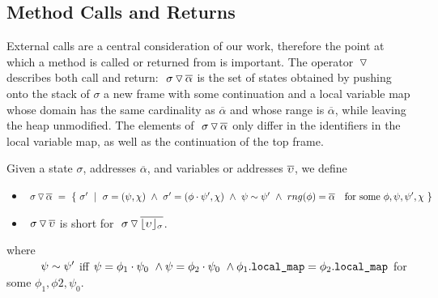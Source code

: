 \subsection{ Method Calls and Returns}


{External calls are a central consideration of our work, therefore  the point at which a method is called or returned from is important.
The operator $\, {\triangledown}\,$ describes both call and return:
 $  \ {\sigma} \, {\triangledown}\, \overline{\alpha}  $ is  the set of states obtained by pushing onto the stack of $\sigma$ a new frame with some continuation  and a local variable map {whose domain has the same cardinality as $\overline \alpha$ and whose range is} $\overline \alpha$, while leaving the heap unmodified.
The elements of $  \ {\sigma} \, {\triangledown}\, \overline{\alpha}  $ only differ in the identifiers in the local variable map, as well as the continuation  of the top frame. 
}

\begin{definition}
\label{def:push:frame}
Given a state $\sigma$, addresses $\overline \alpha$, and variables or addresses $\overline {\upsilon}$, we define
\begin{itemize}
\item
$ \PushS  {\alpha} {\sigma} \ =\ \{ \ \sigma' \ \mid\ \sigma=(\psi, \chi)\  \wedge\  \sigma'=(\phi\cdot \psi', \chi) \ \wedge\ {\psi\sim\psi'} \ \wedge\ rng(\phi)=\overline \alpha \ \ \mbox{ for some } \phi, \psi, \psi', \chi \ \}$
\item
{$  \ {\sigma} \, {\triangledown}\, \overline{\upsilon} $ is short for  $  \ {\sigma} \, {\triangledown}\, \overline{\lfloor \upsilon \rfloor_{\sigma}}  $.}
\end{itemize}
{where}
\\
{$\strut\ \ \ \  \ \ \ \ \   \psi\sim\psi'$ iff $\psi=\phi_1\cdot\psi_0 \ \wedge \psi=\phi_2\cdot\psi_0\ \wedge \phi_1.\mbox{\normalfont{\texttt{local\_map}}}=\phi_2.\mbox{\normalfont{\texttt{local\_map}}}$ for some $\phi_1,\phi2,\psi_0$.}

\end{definition}


